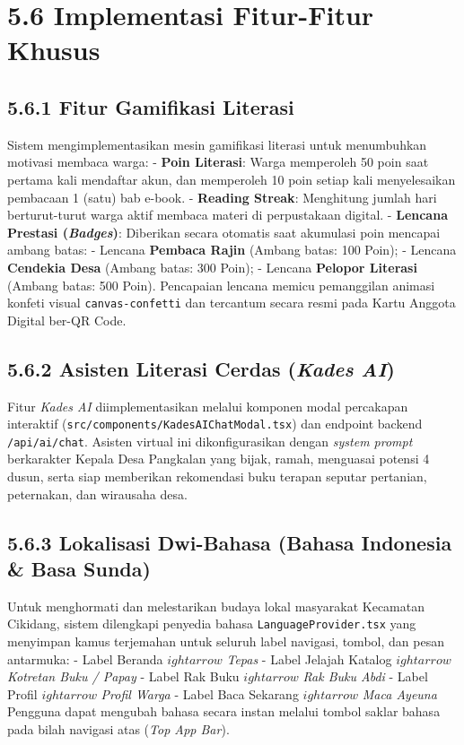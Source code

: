 \documentclass[
  indonesian,
  12pt,
]{report}
\begin{document}
\section{5.6 Implementasi Fitur-Fitur
Khusus}\label{implementasi-fitur-fitur-khusus}

\subsection{5.6.1 Fitur Gamifikasi
Literasi}\label{fitur-gamifikasi-literasi}

Sistem mengimplementasikan mesin gamifikasi literasi untuk menumbuhkan
motivasi membaca warga: - \textbf{Poin Literasi}: Warga memperoleh 50
poin saat pertama kali mendaftar akun, dan memperoleh 10 poin setiap
kali menyelesaikan pembacaan 1 (satu) bab e-book. - \textbf{Reading
Streak}: Menghitung jumlah hari berturut-turut warga aktif membaca
materi di perpustakaan digital. - \textbf{Lencana Prestasi
(\emph{Badges})}: Diberikan secara otomatis saat akumulasi poin mencapai
ambang batas: - Lencana \textbf{Pembaca Rajin} (Ambang batas: 100 Poin);
- Lencana \textbf{Cendekia Desa} (Ambang batas: 300 Poin); - Lencana
\textbf{Pelopor Literasi} (Ambang batas: 500 Poin). Pencapaian lencana
memicu pemanggilan animasi konfeti visual \texttt{canvas-confetti} dan
tercantum secara resmi pada Kartu Anggota Digital ber-QR Code.

\subsection{\texorpdfstring{5.6.2 Asisten Literasi Cerdas (\emph{Kades
AI})}{5.6.2 Asisten Literasi Cerdas (Kades AI)}}\label{asisten-literasi-cerdas-kades-ai}

Fitur \emph{Kades AI} diimplementasikan melalui komponen modal
percakapan interaktif (\texttt{src/components/KadesAIChatModal.tsx}) dan
endpoint backend \texttt{/api/ai/chat}. Asisten virtual ini
dikonfigurasikan dengan \emph{system prompt} berkarakter Kepala Desa
Pangkalan yang bijak, ramah, menguasai potensi 4 dusun, serta siap
memberikan rekomendasi buku terapan seputar pertanian, peternakan, dan
wirausaha desa.

\subsection{5.6.3 Lokalisasi Dwi-Bahasa (Bahasa Indonesia \& Basa
Sunda)}\label{lokalisasi-dwi-bahasa-bahasa-indonesia-basa-sunda}

Untuk menghormati dan melestarikan budaya lokal masyarakat Kecamatan
Cikidang, sistem dilengkapi penyedia bahasa
\texttt{LanguageProvider.tsx} yang menyimpan kamus terjemahan untuk
seluruh label navigasi, tombol, dan pesan antarmuka: - Label Beranda
\(ightarrow\) \emph{Tepas} - Label Jelajah Katalog \(ightarrow\)
\emph{Kotretan Buku / Papay} - Label Rak Buku \(ightarrow\) \emph{Rak
Buku Abdi} - Label Profil \(ightarrow\) \emph{Profil Warga} - Label Baca
Sekarang \(ightarrow\) \emph{Maca Ayeuna} Pengguna dapat mengubah bahasa
secara instan melalui tombol saklar bahasa pada bilah navigasi atas
(\emph{Top App Bar}).
\end{document}
